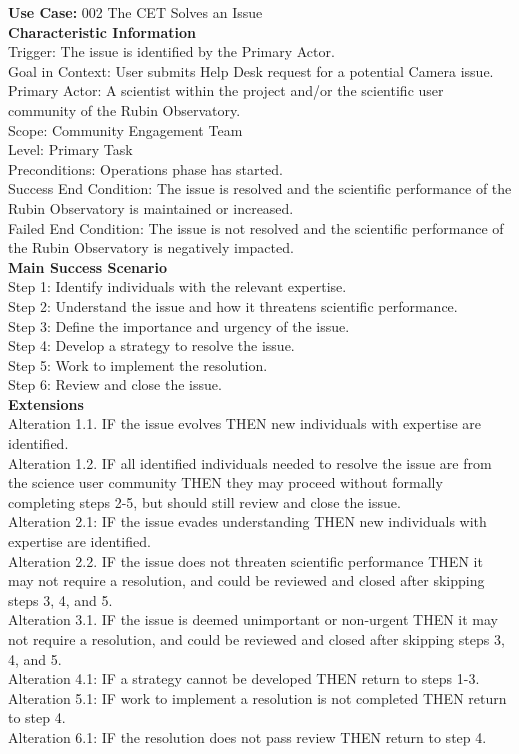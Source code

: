 {\bf Use Case:} 002 The CET Solves an Issue \\

{\bf Characteristic Information} \\
Trigger: The issue is identified by the Primary Actor. \\
Goal in Context: User submits Help Desk request for a potential Camera issue. \\
Primary Actor: A scientist within the project and/or the scientific user community of the Rubin Observatory. \\
Scope: Community Engagement Team \\
Level: Primary Task \\
Preconditions: Operations phase has started. \\
Success End Condition: The issue is resolved and the scientific performance of the Rubin Observatory is maintained or increased. \\
Failed End Condition: The issue is not resolved and the scientific performance of the Rubin Observatory is negatively impacted. \\

{\bf Main Success Scenario} \\
Step 1: Identify individuals with the relevant expertise.\\
Step 2: Understand the issue and how it threatens scientific performance.\\
Step 3: Define the importance and urgency of the issue.\\
Step 4: Develop a strategy to resolve the issue.\\
Step 5: Work to implement the resolution.\\
Step 6: Review and close the issue.\\

{\bf Extensions} \\
Alteration 1.1. IF  the issue evolves THEN new individuals with expertise are identified.\\
Alteration 1.2. IF  all identified individuals needed to resolve the issue are from the science user community THEN they may proceed without formally completing steps 2-5, but should still review and close the issue.\\
Alteration 2.1: IF the issue evades understanding THEN new individuals with expertise are identified.\\
Alteration 2.2. IF the issue does not threaten scientific performance THEN it may not require a resolution, and could be reviewed and closed after skipping steps 3, 4, and 5.\\
Alteration 3.1. IF the issue is deemed unimportant or non-urgent THEN it may not require a resolution, and could be reviewed and closed after skipping steps 3, 4, and 5.\\
Alteration 4.1: IF a strategy cannot be developed THEN return to steps 1-3.\\
Alteration 5.1: IF work to implement a resolution is not completed THEN return to step 4.\\
Alteration 6.1: IF the resolution does not pass review THEN return to step 4.\\

